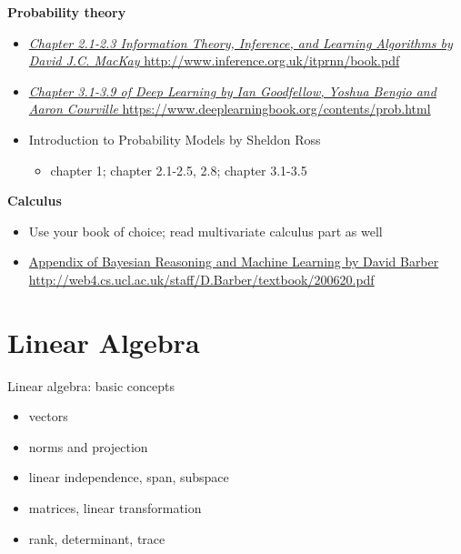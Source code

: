 \documentclass{scrartcl}
\def\tightlist{}
\begin{document}
\begin{frame}{}
\protect\hypertarget{section}{}

\textbf{Probability theory}

\begin{itemize}
\tightlist
\item
  \href{http://www.inference.org.uk/itprnn/book.pdf}{\emph{Chapter
  2.1-2.3 Information Theory, Inference, and Learning Algorithms by
  David J.C. MacKay} http://www.inference.org.uk/itprnn/book.pdf}
\item
  \href{https://www.deeplearningbook.org/contents/prob.html}{\emph{Chapter
  3.1-3.9 of Deep Learning by Ian Goodfellow, Yoshua Bengio and Aaron
  Courville} https://www.deeplearningbook.org/contents/prob.html}
\item
  Introduction to Probability Models by Sheldon Ross

  \begin{itemize}
  \tightlist
  \item
    chapter 1; chapter 2.1-2.5, 2.8; chapter 3.1-3.5
  \end{itemize}
\end{itemize}

\textbf{Calculus}

\begin{itemize}
\tightlist
\item
  Use your book of choice; read multivariate calculus part as well
\item
  \href{http://web4.cs.ucl.ac.uk/staff/D.Barber/textbook/200620.pdf}{Appendix
  of Bayesian Reasoning and Machine Learning by David Barber
  http://web4.cs.ucl.ac.uk/staff/D.Barber/textbook/200620.pdf}
\end{itemize}

\end{frame}

\hypertarget{linear-algebra}{%
\section{Linear Algebra}\label{linear-algebra}}

\begin{frame}{Linear algebra: basic concepts}
\protect\hypertarget{linear-algebra-basic-concepts}{}

\begin{itemize}
\tightlist
\item
  vectors \bigskip
\item
  norms and projection \bigskip
\item
  linear independence, span, subspace \bigskip
\item
  matrices, linear transformation \bigskip
\item
  rank, determinant, trace
\end{itemize}

\end{frame}
\end{document}
